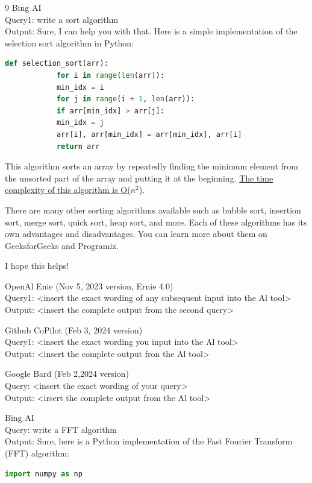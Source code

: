 \documentclass{mcmthesis}
\begin{document}
	\begin{ReportAiUse}{9}
		Bing AI\\
		Query1: write a sort algorithm\\
		Output: Sure, I can help you with that. Here is a simple implementation of the selection sort algorithm in Python:
		\begin{lstlisting}[language=python]
			def selection_sort(arr):
			for i in range(len(arr)):
			min_idx = i
			for j in range(i + 1, len(arr)):
			if arr[min_idx] > arr[j]:
			min_idx = j
			arr[i], arr[min_idx] = arr[min_idx], arr[i]
			return arr
		\end{lstlisting}
		This algorithm sorts an array by repeatedly finding the minimum element from the unsorted part of the array and putting it at the beginning. \href{https://www.geeksforgeeks.org/sorting-algorithms/}{The time complexity of this algorithm is O($n^2$)}.
		
		There are many other sorting algorithms available such as bubble sort, insertion sort, merge sort, quick sort, heap sort, and more. Each of these algorithms has its own advantages and disadvantages. You can learn more about them on GeeksforGeeks and Programiz.
		
		I hope this helps!
		
		OpenAl Enie (Nov 5, 2023 version, Ernie 4.0)\\
		Query1: <insert the exact wording of any subsequent input into the Al tool>\\
		Output: <insert the complete output from the second query>
		
		Github CoPilot (Feb 3, 2024 version)\\
		Query1: <insert the exact wording you input into the Al tool>\\
		Output: <insert the complete output fron the Al tool>
		
		Google Bard (Feb 2,2024 version)\\
		Query: <insert the exact wording of your query>\\
		Output: <irsert the complete output from the Al tool>
		
		Bing AI\\
		Query: write a FFT algorithm\\
		Output: Sure, here is a Python implementation of the Fast Fourier Transform (FFT) algorithm:
		\begin{lstlisting}[language=python]
			import numpy as np
			

\end{lstlisting}
\end{ReportAiUse}
\end{document}
